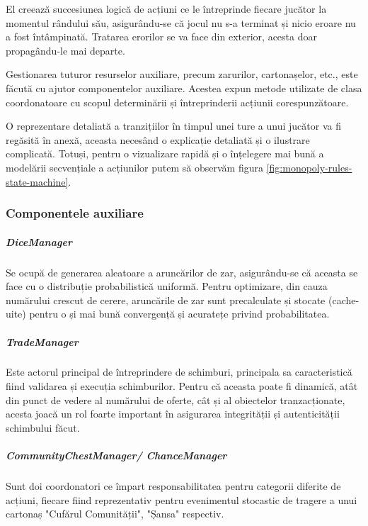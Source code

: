 El creează succesiunea logică de acțiuni ce le întreprinde fiecare jucător la momentul rândului său, asigurându-se că jocul nu s-a terminat și nicio eroare nu a fost întâmpinată. Tratarea erorilor se va face din exterior, acesta doar propagându-le mai departe.

Gestionarea tuturor resurselor auxiliare, precum zarurilor, cartonașelor, etc., este făcută cu ajutor componentelor auxiliare. Acestea expun metode utilizate de clasa coordonatoare cu scopul determinării și întreprinderii acțiunii corespunzătoare.

O reprezentare detaliată a tranzițiilor în timpul unei ture a unui jucător va fi regăsită în anexă, aceasta necesând o explicație detaliată și o ilustrare complicată. Totuși, pentru o vizualizare rapidă și o înțelegere mai bună a modelării secvențiale a acțiunilor putem să observăm figura \ref{fig:monopoly-rules-state-machine}.

\subsubsection{Componentele auxiliare}
\subparagraph{DiceManager}
Se ocupă de generarea aleatoare a aruncărilor de zar, asigurându-se că aceasta se face cu o distribuție probabilistică uniformă. Pentru optimizare, din cauza numărului crescut de cerere, aruncările de zar sunt precalculate și stocate (cache-uite) pentru o și mai bună convergență și acuratețe privind probabilitatea.
\subparagraph{TradeManager}
Este actorul principal de întreprindere de schimburi, principala sa caracteristică fiind validarea și execuția schimburilor. Pentru că aceasta poate fi dinamică, atât din punct de vedere al numărului de oferte, cât și al obiectelor tranzacționate, acesta joacă un rol foarte important în asigurarea integrității și autenticității schimbului făcut.
\subparagraph{CommunityChestManager/ ChanceManager}
Sunt doi coordonatori ce împart responsabilitatea pentru categorii diferite de acțiuni, fiecare fiind reprezentativ pentru evenimentul stocastic de tragere a unui cartonaș "Cufărul Comunității", "Șansa" respectiv.

